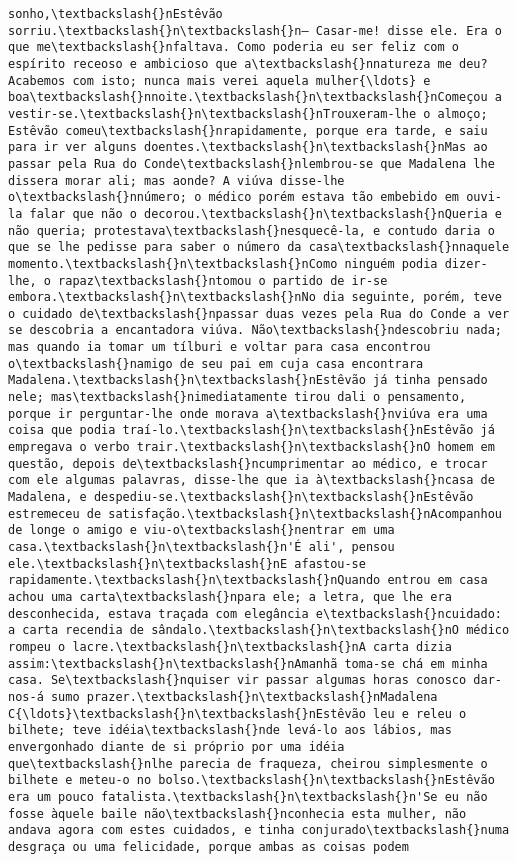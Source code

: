 \begin{Verbatim}[commandchars=\\\{\}]
sonho,\textbackslash{}nEstêvão sorriu.\textbackslash{}n\textbackslash{}n— Casar-me! disse ele. Era o que me\textbackslash{}nfaltava. Como poderia eu ser feliz com o espírito receoso e ambicioso que a\textbackslash{}nnatureza me deu? Acabemos com isto; nunca mais verei aquela mulher{\ldots} e boa\textbackslash{}nnoite.\textbackslash{}n\textbackslash{}nComeçou a vestir-se.\textbackslash{}n\textbackslash{}nTrouxeram-lhe o almoço; Estêvão comeu\textbackslash{}nrapidamente, porque era tarde, e saiu para ir ver alguns doentes.\textbackslash{}n\textbackslash{}nMas ao passar pela Rua do Conde\textbackslash{}nlembrou-se que Madalena lhe dissera morar ali; mas aonde? A viúva disse-lhe o\textbackslash{}nnúmero; o médico porém estava tão embebido em ouvi-la falar que não o decorou.\textbackslash{}n\textbackslash{}nQueria e não queria; protestava\textbackslash{}nesquecê-la, e contudo daria o que se lhe pedisse para saber o número da casa\textbackslash{}nnaquele momento.\textbackslash{}n\textbackslash{}nComo ninguém podia dizer-lhe, o rapaz\textbackslash{}ntomou o partido de ir-se embora.\textbackslash{}n\textbackslash{}nNo dia seguinte, porém, teve o cuidado de\textbackslash{}npassar duas vezes pela Rua do Conde a ver se descobria a encantadora viúva. Não\textbackslash{}ndescobriu nada; mas quando ia tomar um tílburi e voltar para casa encontrou o\textbackslash{}namigo de seu pai em cuja casa encontrara Madalena.\textbackslash{}n\textbackslash{}nEstêvão já tinha pensado nele; mas\textbackslash{}nimediatamente tirou dali o pensamento, porque ir perguntar-lhe onde morava a\textbackslash{}nviúva era uma coisa que podia traí-lo.\textbackslash{}n\textbackslash{}nEstêvão já empregava o verbo trair.\textbackslash{}n\textbackslash{}nO homem em questão, depois de\textbackslash{}ncumprimentar ao médico, e trocar com ele algumas palavras, disse-lhe que ia à\textbackslash{}ncasa de Madalena, e despediu-se.\textbackslash{}n\textbackslash{}nEstêvão estremeceu de satisfação.\textbackslash{}n\textbackslash{}nAcompanhou de longe o amigo e viu-o\textbackslash{}nentrar em uma casa.\textbackslash{}n\textbackslash{}n'É ali', pensou ele.\textbackslash{}n\textbackslash{}nE afastou-se rapidamente.\textbackslash{}n\textbackslash{}nQuando entrou em casa achou uma carta\textbackslash{}npara ele; a letra, que lhe era desconhecida, estava traçada com elegância e\textbackslash{}ncuidado: a carta recendia de sândalo.\textbackslash{}n\textbackslash{}nO médico rompeu o lacre.\textbackslash{}n\textbackslash{}nA carta dizia assim:\textbackslash{}n\textbackslash{}nAmanhã toma-se chá em minha casa. Se\textbackslash{}nquiser vir passar algumas horas conosco dar-nos-á sumo prazer.\textbackslash{}n\textbackslash{}nMadalena C{\ldots}\textbackslash{}n\textbackslash{}nEstêvão leu e releu o bilhete; teve idéia\textbackslash{}nde levá-lo aos lábios, mas envergonhado diante de si próprio por uma idéia que\textbackslash{}nlhe parecia de fraqueza, cheirou simplesmente o bilhete e meteu-o no bolso.\textbackslash{}n\textbackslash{}nEstêvão era um pouco fatalista.\textbackslash{}n\textbackslash{}n'Se eu não fosse àquele baile não\textbackslash{}nconhecia esta mulher, não andava agora com estes cuidados, e tinha conjurado\textbackslash{}numa desgraça ou uma felicidade, porque ambas as coisas podem 
\end{Verbatim}
